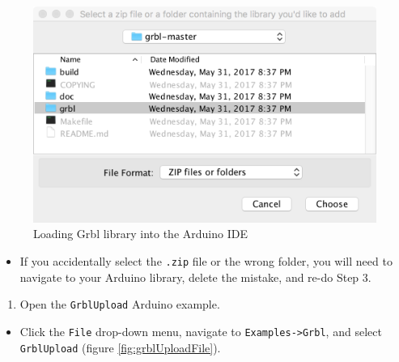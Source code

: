 \documentclass[
]{book}
\providecommand{\tightlist}{%
  \setlength{\itemsep}{0pt}\setlength{\parskip}{0pt}}
\begin{document}
\begin{figure}

{\centering \includegraphics[width=0.75\linewidth]{images/add_grbl_lib} 

}

\caption{Loading Grbl library into the Arduino IDE}\label{fig:addGrblLib}
\end{figure}

\begin{itemize}
\tightlist
\item
  If you accidentally select the \texttt{.zip} file or the wrong folder, you will need to navigate to your Arduino library, delete the mistake, and re-do Step 3.
\end{itemize}

\begin{enumerate}
\def\labelenumi{\arabic{enumi}.}
\setcounter{enumi}{3}
\tightlist
\item
  Open the \texttt{GrblUpload} Arduino example.
\end{enumerate}

\begin{itemize}
\tightlist
\item
  Click the \texttt{File} drop-down menu, navigate to \texttt{Examples-\textgreater{}Grbl}, and select \texttt{GrblUpload} (figure \ref{fig:grblUploadFile}).
\end{itemize}
\end{document}
